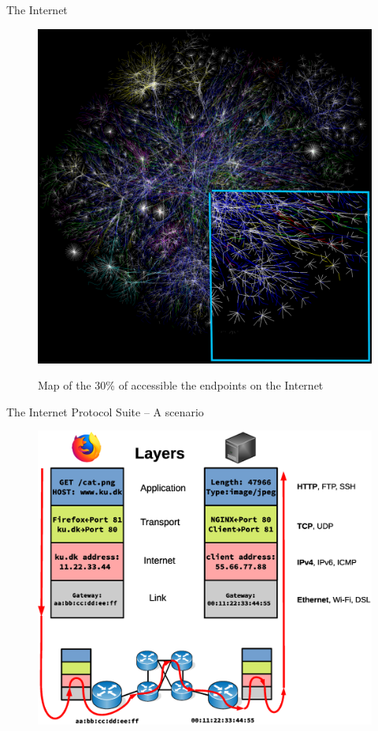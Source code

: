 \begin{frame}
The Internet

\begin{figure}
	\centering
\includegraphics[scale=0.20]{./background/internet_map_30p.png}
\label{fig: Internet map}
\caption{Map of the 30\% of accessible the endpoints on the Internet}
\end{figure}

\end{frame}


\begin{frame}
The Internet Protocol Suite -- A scenario
\begin{figure}
	\centering
\includegraphics[scale=0.30]{./background/internet_scenario.eps}
\end{figure}



\end{frame}


